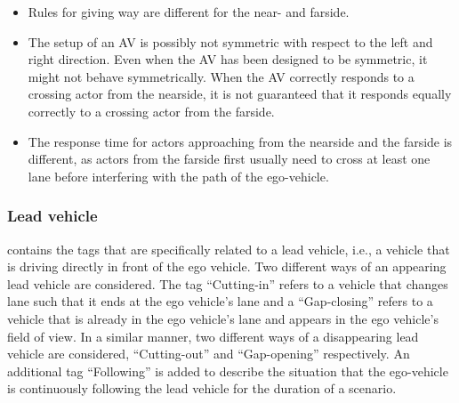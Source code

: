 \label{page:reasons for distinction far and near}
\begin{itemize}
	\item Rules for giving way are different for the near- and farside.
	\item The setup of an AV is possibly not symmetric with respect to the left and right direction. Even when the AV has been designed to be symmetric, it might not behave symmetrically. When the AV correctly responds to a crossing actor from the nearside, it is not guaranteed that it responds equally correctly to a crossing actor from the farside.
	\item The response time for actors approaching from the nearside and the farside is different, as actors from the farside first usually need to cross at least one lane before interfering with the path of the ego-vehicle.  
\end{itemize}



\subsubsection{Lead vehicle}
 contains the tags that are specifically related to a lead vehicle, i.e., a vehicle that is driving directly in front of the ego vehicle. Two different ways of an appearing lead vehicle are considered. The tag ``Cutting-in'' refers to a vehicle that changes lane such that it ends at the ego vehicle's lane and a ``Gap-closing'' refers to a vehicle that is already in the ego vehicle's lane and appears in the ego vehicle's field of view. In a similar manner, two different ways of a disappearing lead vehicle are considered, ``Cutting-out'' and ``Gap-opening'' respectively. An additional tag ``Following'' is added to describe the situation that the ego-vehicle is continuously following the lead vehicle for the duration of a scenario.

